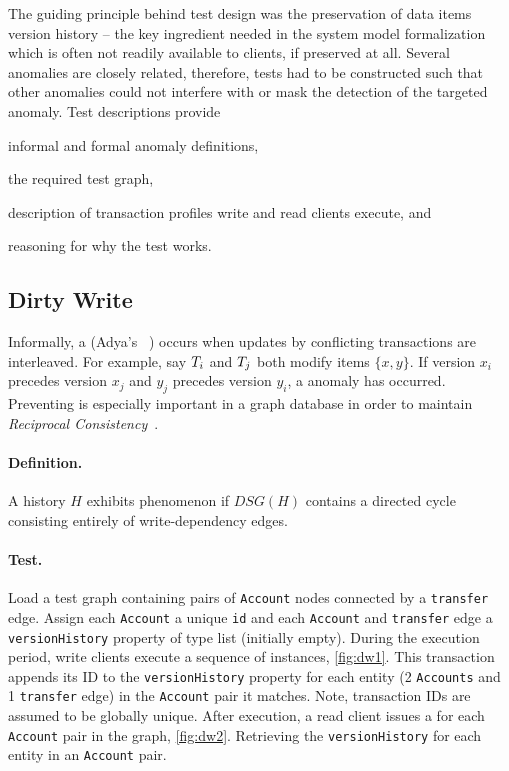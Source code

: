 The guiding principle behind test design was the preservation of data items 
version history -- the key ingredient needed in the system model formalization 
which is often not readily available to clients, if preserved at all. Several 
anomalies are closely related, therefore, tests had to be constructed such that 
other anomalies could not interfere with or mask the detection of the targeted 
anomaly. Test descriptions provide
\begin{enumerate*}[label={(\roman*)}]
  \item informal and formal anomaly definitions,
  \item the required test graph,
  \item description of transaction profiles write and read clients execute, and
  \item reasoning for why the test works.
\end{enumerate*}


\subsection{Dirty Write}
\label{sec:dirty-write}

Informally, a  (Adya's ~\cite{adya1999weak})
occurs when updates by conflicting transactions are interleaved. For example, 
say $T_i$ and $T_j$ both modify items $\{x,y\}$. If version $x_i$ 
precedes version $x_j$ and $y_j$ precedes version $y_i$, a  anomaly 
has occurred. Preventing  is especially important in a graph 
database in order to maintain \emph{Reciprocal Consistency}~\cite{Waudby2020}.

\paragraph{Definition.}
A history $H$ exhibits phenomenon  if $\textit{DSG}(H)$ contains a 
directed cycle consisting entirely of write-dependency edges.

\paragraph{Test.}
Load a test graph containing pairs of \texttt{Account} nodes connected by a 
\texttt{transfer} edge. Assign each \texttt{Account} a unique \texttt{id} and 
each \texttt{Account} and \texttt{transfer} edge a \texttt{versionHistory} 
property of type list (initially empty). During the execution period, write 
clients execute a sequence of  instances, \autoref{fig:dw1}.
This transaction appends its ID to the \texttt{versionHistory} property for each 
entity (2 \texttt{Accounts} and 1 \texttt{transfer} edge) in the \texttt{Account}
pair it matches. Note, transaction IDs are assumed to be globally unique. After 
execution, a read client issues a  for each 
\texttt{Account} pair in the graph, \autoref{fig:dw2}. Retrieving the 
\texttt{versionHistory} for each entity in an \texttt{Account} pair.

